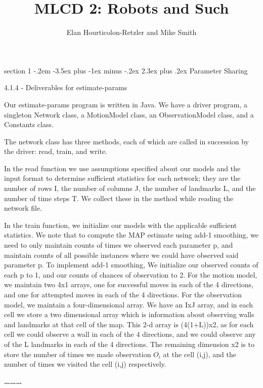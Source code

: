 \documentclass[12pt]{article}
\makeatletter
\newenvironment{problem}{\@startsection
       {section}
       {1}
       {-.2em}
       {-3.5ex plus -1ex minus -.2ex}
       {2.3ex plus .2ex}
       {\pagebreak[3]%
       \large\bf\noindent{Problem }
       }
       }
       {%
       \begin{center}\large\bf \ldots\ldots\ldots\end{center}}
\makeatother
\begin{document}
\title{MLCD 2: Robots and Such }
\author{Elan Hourticolon-Retzler and Mike Smith}

\maketitle

\thispagestyle{empty}

\begin{problem}{Parameter Sharing}


4.1.4 - Deliverables for estimate-params

Our estimate-params program is written in Java.  We have a driver 
program, a singleton Network class, a MotionModel class, an 
ObservationModel class, and a Constants class.

The network class has three methods, each of which are called in 
succession by the driver: read, train, and write.

In the read function we use assumptions specified about our models and 
the input format to determine sufficient statistics for each network; 
they are the number of rows I, the number of columns J, the number of 
landmarks L, and the number of time steps T.  We collect these in the 
method while reading the network file.

In the train function, we initialize our models with the applicable 
sufficient statistics.  We note that to compute the MAP estimate using
add-1 smoothing, we need to only maintain counts of times we observed 
each parameter p, and maintain counts of all possible instances where 
we could have observed said parameter p.  To implement add-1 smoothing, 
We initialize our observed counts of each p to 1, and our counts of 
chances of observation to 2.
For the motion model, we maintain two 4x1 arrays, one for successful 
moves in each of the 4 directions, and one for attempted moves in each 
of the 4 directions.
For the observation model, we maintain a four-dimensional array.  We 
have an IxJ array, and in each cell we store a two dimensional array 
which is information about observing walls and landmarks at that cell 
of the map.  This 2-d array is (4(1+L))x2, as for each cell we could 
observe a wall in each of the 4 directions, and we could observe any of
 the L landmarks in each of the 4 directions.  The remaining dimension 
x2 is to store the number of times we made observation $O_i$ at the cell 
(i,j), and the number of times we visited the cell (i,j) respectively.


\end{problem}
\end{document}
